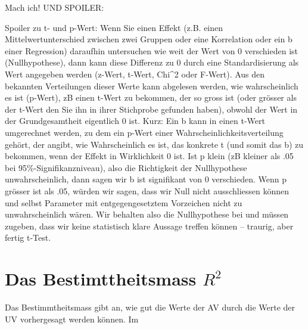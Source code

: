 \documentclass[
  10pt,
  letterpaper,
  a4paper, twoside]{scrreprt}
\begin{document}
\begin{tcolorbox}[enhanced jigsaw, coltitle=black, opacitybacktitle=0.6, toptitle=1mm, colbacktitle=quarto-callout-important-color!10!white, colback=white, toprule=.15mm, opacityback=0, bottomrule=.15mm, arc=.35mm, colframe=quarto-callout-important-color-frame, leftrule=.75mm, titlerule=0mm, breakable, left=2mm, rightrule=.15mm, title={Q\&A: Könnten Sie noch einmal einen kurzen Input zu den
Signifikanz-Kennwerten der Regression machen?}, bottomtitle=1mm]

Mach ich! UND SPOILER:

Spoiler zu t- und p-Wert: Wenn Sie einen Effekt (z.B. einen
Mittelwertunterschied zwischen zwei Gruppen oder eine Korrelation oder
ein b einer Regression) daraufhin untersuchen wie weit der Wert von 0
verschieden ist (Nullhypothese), dann kann diese Differenz zu 0 durch
eine Standardisierung als Wert angegeben werden (z-Wert, t-Wert,
Chi\^{}2 oder F-Wert). Aus den bekannten Verteilungen dieser Werte kann
abgelesen werden, wie wahrscheinlich es ist (p-Wert), zB einen t-Wert zu
bekommen, der so gross ist (oder grösser als der t-Wert den Sie ihn in
ihrer Stichprobe gefunden haben), obwohl der Wert in der Grundgesamtheit
eigentlich 0 ist. Kurz: Ein b kann in einen t-Wert umgerechnet werden,
zu dem ein p-Wert einer Wahrscheinlichkeitsverteilung gehört, der
angibt, wie Wahrscheinlich es ist, das konkrete t (und somit das b) zu
bekommen, wenn der Effekt in Wirklichkeit 0 ist. Ist p klein (zB kleiner
als .05 bei 95\%-Signifikanzniveau), also die Richtigkeit der
Nullhypothese unwahrscheinlich, dann sagen wir b ist signifikant von 0
verschieden. Wenn p grösser ist als .05, würden wir sagen, dass wir Null
nicht ausschliessen können und selbst Parameter mit entgegengesetztem
Vorzeichen nicht zu unwahrscheinlich wären. Wir behalten also die
Nullhypothese bei und müssen zugeben, dass wir keine statistisch klare
Aussage treffen können -- traurig, aber fertig t-Test.

\end{tcolorbox}

\section{\texorpdfstring{Das Bestimttheitsmass
\(R^2\)}{Das Bestimttheitsmass R\^{}2}}\label{das-bestimttheitsmass-r2}

Das Bestimmtheitsmass gibt an, wie gut die Werte der AV durch die Werte
der UV vorhergesagt werden können. Im
\end{document}
